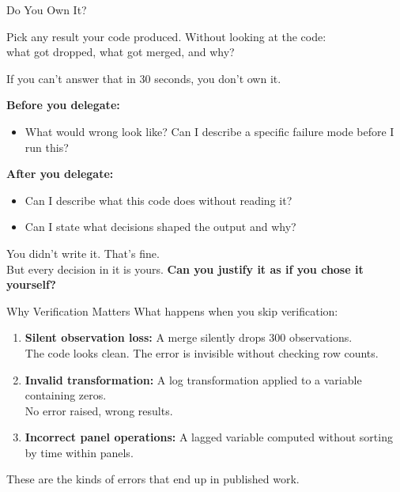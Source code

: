 \documentclass[aspectratio=169, 11pt]{beamer}
\begin{document}
\begin{frame}{Do You Own It?}
  \begin{block}{}
    Pick any result your code produced. Without looking at the code:\\
    what got dropped, what got merged, and why?
  \end{block}

  \vspace{0.3em}
  If you can't answer that in 30 seconds, you don't own it.

  \vspace{0.5em}
  \textbf{Before you delegate:}
  \begin{itemize}
    \item What would wrong look like? Can I describe a specific failure mode before I run this?
  \end{itemize}

  \vspace{0.3em}
  \textbf{After you delegate:}
  \begin{itemize}
    \item Can I describe what this code does without reading it?
    \item Can I state what decisions shaped the output and why?
  \end{itemize}

  \vspace{0.5em}
  You didn't write it. That's fine.\\
  But every decision in it is yours. \textbf{Can you justify it as if you chose it yourself?}
\end{frame}


\begin{frame}{Why Verification Matters}
  {\large What happens when you skip verification:}

  \vspace{0.8em}
  \begin{enumerate}
    \item \textbf{Silent observation loss:} A merge silently drops 300 observations.\\
      The code looks clean. The error is invisible without checking row counts.

      \vspace{0.5em}
    \item \textbf{Invalid transformation:} A log transformation applied to a variable containing zeros.\\
      No error raised, wrong results.

      \vspace{0.5em}
    \item \textbf{Incorrect panel operations:} A lagged variable computed without sorting by time within panels.
  \end{enumerate}

  \vspace{0.5em}
  \alert{These are the kinds of errors that end up in published work.}
\end{frame}
\end{document}
